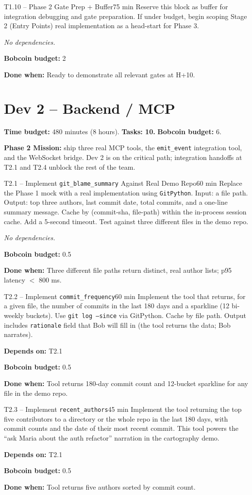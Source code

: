 \documentclass[11pt,letterpaper]{article}
\newcommand{\acceptance}[1]{\par\smallskip\textcolor{ibmgreen}{\textbf{Done when:}} #1}
\newcommand{\depends}[1]{\par\smallskip\textcolor{ibmorange}{\textbf{Depends on:}} #1}
\newcommand{\nodep}{\par\smallskip\textcolor{ibmgray}{\textit{No dependencies.}}}
\newcommand{\bobcost}[1]{\par\smallskip\textcolor{ibmaccent}{\textbf{Bobcoin budget:}} #1}
\begin{document}
\begin{task}{T1.10 -- Phase 2 Gate Prep + Buffer}{75 min}
Reserve this block as buffer for integration debugging and gate preparation. If under budget, begin scoping Stage 2 (Entry Points) real implementation as a head-start for Phase 3.
\nodep
\bobcost{2}
\acceptance{Ready to demonstrate all relevant gates at H+10.}
\end{task}

\section{Dev 2 -- Backend / MCP}

\textbf{Time budget:} 480 minutes (8 hours). \textbf{Tasks: 10.} \textbf{Bobcoin budget:} 6.

\textbf{Phase 2 Mission:} ship three real MCP tools, the \texttt{emit\_event} integration tool, and the WebSocket bridge. Dev 2 is on the critical path; integration handoffs at T2.1 and T2.4 unblock the rest of the team.

\begin{task}{T2.1 -- Implement \texttt{git\_blame\_summary} Against Real Demo Repo}{60 min}
Replace the Phase 1 mock with a real implementation using \texttt{GitPython}. Input: a file path. Output: top three authors, last commit date, total commits, and a one-line summary message. Cache by (commit-sha, file-path) within the in-process session cache. Add a 5-second timeout. Test against three different files in the demo repo.
\nodep
\bobcost{0.5}
\acceptance{Three different file paths return distinct, real author lists; p95 latency $<$ 800 ms.}
\end{task}

\begin{task}{T2.2 -- Implement \texttt{commit\_frequency}}{60 min}
Implement the tool that returns, for a given file, the number of commits in the last 180 days and a sparkline (12 bi-weekly buckets). Use \texttt{git log --since} via GitPython. Cache by file path. Output includes \texttt{rationale} field that Bob will fill in (the tool returns the data; Bob narrates).
\depends{T2.1}
\bobcost{0.5}
\acceptance{Tool returns 180-day commit count and 12-bucket sparkline for any file in the demo repo.}
\end{task}

\begin{task}{T2.3 -- Implement \texttt{recent\_authors}}{45 min}
Implement the tool returning the top five contributors to a directory or the whole repo in the last 180 days, with commit counts and the date of their most recent commit. This tool powers the ``ask Maria about the auth refactor'' narration in the cartography demo.
\depends{T2.1}
\bobcost{0.5}
\acceptance{Tool returns five authors sorted by commit count.}
\end{task}
\end{document}
